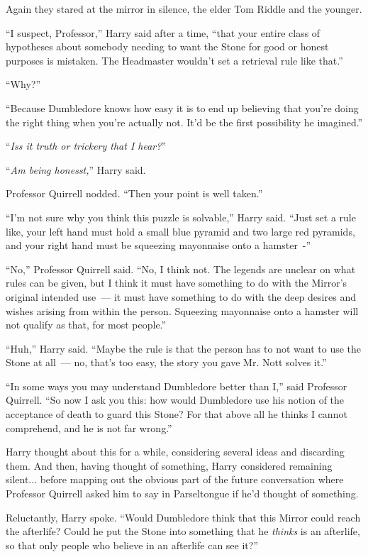 Again they stared at the mirror in silence, the elder Tom Riddle and the younger.

``I suspect, Professor,'' Harry said after a time, ``that your entire class of hypotheses about somebody needing to want the Stone for good or honest purposes is mistaken. The Headmaster wouldn't set a retrieval rule like that.''

``Why?''

``Because Dumbledore knows how easy it is to end up believing that you're doing the right thing when you're actually not. It'd be the first possibility he imagined.''

``\emph{Iss it truth or trickery that I hear?}''

``\emph{Am being honesst,}'' Harry said.

Professor Quirrell nodded. ``Then your point is well taken.''

``I'm not sure why you think this puzzle is solvable,'' Harry said. ``Just set a rule like, your left hand must hold a small blue pyramid and two large red pyramids, and your right hand must be squeezing mayonnaise onto a hamster~-''

``No,'' Professor Quirrell said. ``No, I think not. The legends are unclear on what rules can be given, but I think it must have something to do with the Mirror's original intended use~--- it must have something to do with the deep desires and wishes arising from within the person. Squeezing mayonnaise onto a hamster will not qualify as that, for most people.''

``Huh,'' Harry said. ``Maybe the rule is that the person has to not want to use the Stone at all~--- no, that's too easy, the story you gave Mr. Nott solves it.''

``In some ways you may understand Dumbledore better than I,'' said Professor Quirrell. ``So now I ask you this: how would Dumbledore use his notion of the acceptance of death to guard this Stone? For that above all he thinks I cannot comprehend, and he is not far wrong.''

Harry thought about this for a while, considering several ideas and discarding them. And then, having thought of something, Harry considered remaining silent... before mapping out the obvious part of the future conversation where Professor Quirrell asked him to say in Parseltongue if he'd thought of something.

Reluctantly, Harry spoke. ``Would Dumbledore think that this Mirror could reach the afterlife? Could he put the Stone into something that he \emph{thinks} is an afterlife, so that only people who believe in an afterlife can see it?''

